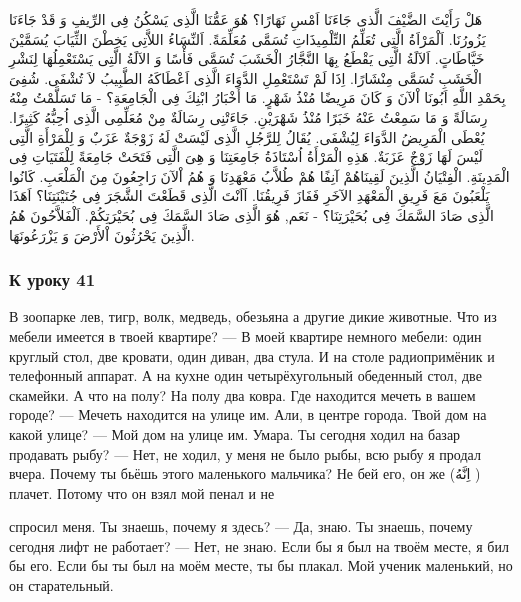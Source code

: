 \documentclass[a5paper]{article}
\begin{document}
هَلْ رَأَيْتَ الضَّيْفَ الَّذى جَاءَنَا اَمْسِ نَهَارًا؟ هُوَ عَمُّنَا الَّذِى يَسْكُنُ فِى الرِّيفِ وَ قَدْ جَاءَنَا يَزُورُنَا. اَلْمَرْاَةُ الَّتِى تُعَلِّمُ التِّلْمِيذَاتِ تُسَمَّى مُعَلِّمَةً. اَلنِّسَاءُ اللاَّتِى يَخِطْنَ الثِّيَابَ يُسَمَّيْنَ خَيَّاطَاتٍ. اَلآلَةُ الَّتِى يَقْطَعُ بِهَا النَّجَّارُ الْخَشَبَ تُسَمَّى فَأْسًا وَ الآلَةُ الَّتِى يَسْتَعْمِلُهَا لِنَشْرِ الْخَشَبِ تُسَمَّى مِنْشَارًا. اِذَا لَمْ تَسْتَعْمِلِ الدَّوَاءَ الَّذِى اَعْطَاكَهُ الطَّبِيبُ لاَ تُشْفَى. شُفِىَ بِحَمْدِ اللَّهِ اَبُونَا اْلآنَ وَ كَانَ مَرِيضًا مُنْذُ شَهْرٍ. مَا أَخْبَارُ ابْنِكَ فِى الْجَامِعَةِ؟ - مَا تَسَلَّمْتُ مِنْهُ رِسَالَةً وَ مَا سَمِعْتُ عَنْهُ خَبَرًا مُنْذُ شَهْرَيْنِ. جَاءَتْنِى رِسَالَةٌ مِنْ مُعَلِّمِى الَّذِى اُحِبُّهُ كَثِيرًا. يُعْطَى الْمَرِيضُ الدَّوَاءَ لِيُشْفَى. يُقَالُ لِلرَّجُلِ الَّذِى لَيْسَتْ لَهُ زَوْجَةٌ عَزَبٌ وَ لِلْمَرْأَةِ الَّتِى لَيْسَ لَهَا زَوْجٌ عَزَبَةٌ. هَذِهِ الْمَرْأَةُ اُسْتَاذَةُ جَامِعَتِنَا وَ هِىَ الَّتِى فَتَحَتْ جَامِعَةً لِلْفَتَيَاتِ فِى الْمَدِينَةِ. الْفِتْيَانُ الَّذِينَ لَقِينَاهُمْ آنِفًا هُمْ طُلاَّبُ مَعْهَدِنَا وَ هُمُ اْلآنَ رَاجِعُونَ مِنَ الْمَلْعَبِ. كَانُوا يَلْعَبُونَ مَعَ فَرِيقِ الْمَعْهَدِ الآخَرِ فَفَازَ فَرِيقُنَا. اَاَنْتَ الَّذِى قَطَعْتَ الشَّجَرَ فِى جُنَيْنَتِنَا؟ اَهَذَا الَّذِى صَادَ السَّمَكَ فِى بُحَيْرَتِنَا؟ - نَعَم, هُوَ الَّذِى صَادَ السَّمَكَ فِى بُحَيْرَتِكُمْ. اَلْفَلاَّحُونَ هُمُ الَّذِينَ يَحْرُثُونَ اْلأَرْضَ وَ يَزْرَعُونَهَا.

\subsubsection{К уроку 41}
В зоопарке лев, тигр, волк, медведь, обезьяна а другие дикие животные. Что из мебели имеется в твоей квартире? — В моей квартире немного мебели: один круглый стол, две кровати, один диван, два стула. И на столе радиопримёник и телефонный аппарат. А на кухне один четырёхугольный обеденный стол, две скамейки. А что на полу? На полу два ковра. Где находится мечеть в вашем городе? — Мечеть находится на улице им. Али, в центре города. Твой дом на какой улице? — Мой дом на улице им. Умара. Ты сегодня ходил на базар продавать рыбу? — Нет, не ходил, у меня не было рыбы, всю рыбу я продал вчера. Почему ты бьёшь этого маленького мальчика? Не бей его, он же (اِنَّهُ ) плачет. Потому что он взял мой пенал и не

спросил меня. Ты знаешь, почему я здесь? — Да, знаю. Ты знаешь, почему сегодня лифт не работает? — Нет, не знаю. Если бы я был на твоём месте, я бил бы его. Если бы ты был на моём месте, ты бы плакал. Мой ученик маленький, но он старательный.
\end{document}
